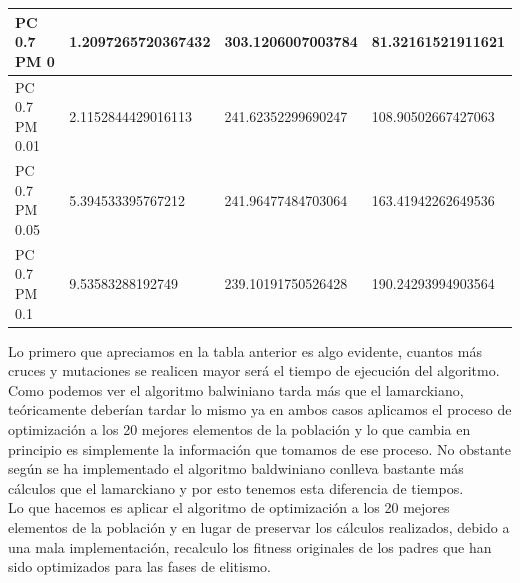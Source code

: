 \documentclass[10pt,a4paper]{article}
\begin{document}
\begin{center}
\begin{table}[H]
\begin{tabular}{|l|l|l|l|}
PC 0.7 PM 0                         & 1.2097265720367432                                             & 303.1206007003784                                                 & 81.32161521911621                                                 \\ \hline
PC 0.7 PM 0.01                      & 2.1152844429016113                                             & 241.62352299690247                                                & 108.90502667427063                                                \\ \hline
PC 0.7 PM 0.05                      & 5.394533395767212                                              & 241.96477484703064                                                & 163.41942262649536                                                \\ \hline
PC 0.7 PM 0.1                       & 9.53583288192749                                               & 239.10191750526428                                                & 190.24293994903564                                                \\ \hline
\end{tabular}
\end{table}
\end{center}

Lo primero que apreciamos en la tabla anterior es algo evidente, cuantos más cruces y mutaciones se realicen mayor será el tiempo de ejecución del algoritmo. Como podemos ver el algoritmo balwiniano tarda más que el lamarckiano, teóricamente deberían tardar lo mismo ya en ambos casos aplicamos el proceso de optimización a los 20 mejores elementos de la población y lo que cambia en principio es simplemente la información que tomamos de ese proceso. No obstante según se ha implementado el algoritmo baldwiniano conlleva bastante más cálculos que el lamarckiano y por esto tenemos esta diferencia de tiempos.\\

Lo que hacemos es aplicar el algoritmo de optimización a los 20 mejores elementos de la población y en lugar de preservar los cálculos realizados, debido a una mala implementación, recalculo los fitness originales de los padres que han sido optimizados para las fases de elitismo.\\
\end{document}
